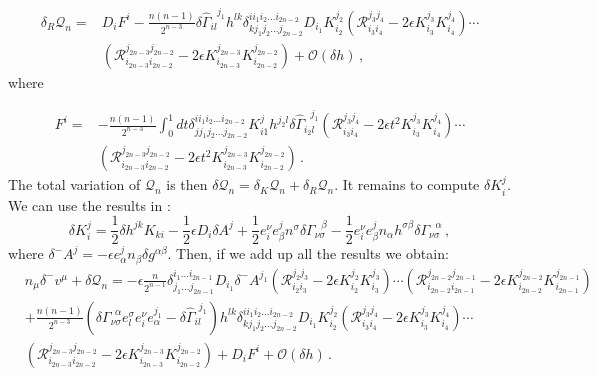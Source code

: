 \documentclass[11pt,letterpaper]{article}
\newcommand{\dslash}{\delta^{\!\!\!\!-}\!}
\begin{document}
\begin{equation}
\begin{aligned}
\delta_{R}\mathcal{Q}_n=&D_ i F^i-\frac{n(n-1)}{2^{n-3}}\delta \hat\Gamma_{i l}^{\ \ \ j_1}h^{l k} \delta^{i i_1 i_2\dots i_{2n-2}}_{k j_1 j_2\dots j_{2n-2}}D_{i_1}K_{i_2}^{j_2}\left(\mathcal{R}^{j_3 j_4}_{i_3i_4}-2\epsilon K^{j_3}_{i_3}K^{j_4}_{i_4}\right)\cdots \\
&\left(\mathcal{R}^{j_{2n-3}j_{2n-2}}_{i_{2n-3}i_{2n-2}}-2\epsilon K^{j_{2n-3}}_{i_{2n-3}}K^{j_{2n-2}}_{i_{2n-2}}\right)+\mathcal{O}(\delta h)\,,
\end{aligned}
\end{equation}
where

\begin{equation}
\begin{aligned}
F^i=&-\frac{n(n-1)}{2^{n-3}}\int_{0}^{1}dt \delta^{i i_1 i_2\dots i_{2n-2}}_{j j_1 j_2\dots j_{2n-2}} K^{j}_{i1} h^{j_2 l}\delta \hat\Gamma_{i_2 l}^{\ \ \ j_1}\left(\mathcal{R}^{j_3 j_4}_{i_3i_4}-2\epsilon t^2 K^{j_3}_{i_3}K^{j_4}_{i_4}\right)\cdots \\
&\left(\mathcal{R}^{j_{2n-3}j_{2n-2}}_{i_{2n-3}i_{2n-2}}-2\epsilon t^2 K^{j_{2n-3}}_{i_{2n-3}}K^{j_{2n-2}}_{i_{2n-2}}\right)\,.
\end{aligned}
\end{equation}
The total variation of $\mathcal{Q}_n$ is then $\delta \mathcal{Q}_n=\delta_{K} \mathcal{Q}_n+\delta_{R} \mathcal{Q}_n$. It remains to compute $\delta K^{j}_{i}$. We can use the results in \cite{Lehner:2016vdi}:
\begin{equation}
\delta K^{j}_{i}=\frac{1}{2}\delta h^{jk} K_{ki}-\frac{1}{2}\epsilon D_i \delta A^j+\frac{1}{2}e_{i}^{\nu}e^{j}_{\beta}n^{\sigma}\delta \Gamma_{\nu\sigma}^{\ \ \ \beta}-\frac{1}{2}e_{i}^{\nu}e^{j}_{\beta}n_{\alpha}h^{\sigma\beta}\delta \Gamma_{\nu\sigma}^{\ \ \ \alpha}\, ,
\end{equation}
where $\dslash  A^j=-\epsilon e^{j}_{\alpha}n_{\beta}\delta g^{\alpha\beta}$. Then, if we add up all the results we obtain:
\begin{equation}
\begin{aligned}
&n_{\mu}\dslash  v^{\mu}+\delta \mathcal{Q}_n=-\epsilon\frac{n}{2^{n-1}}\delta^{i_1\dots i_{2n-1}}_{j_1\dots j_{2n-1}}D_{i_1} \dslash  A^{j_1}\left(\mathcal{R}^{j_2 j_3}_{i_2i_3}-2\epsilon K^{j_2}_{i_2}K^{j_3}_{i_3}\right)\cdots \left(\mathcal{R}^{j_{2n-2}j_{2n-1}}_{i_{2n-2}i_{2n-1}}-2\epsilon K^{j_{2n-2}}_{i_{2n-2}}K^{j_{2n-1}}_{i_{2n-1}}\right)\\
&+\frac{n(n-1)}{2^{n-3}}\left(\delta \Gamma_{\nu\sigma}^{\ \ \alpha}e^{\sigma}_{l} e^{\nu}_{i}e_{\alpha}^{j_1}-\delta \hat\Gamma_{i l}^{\ \ j_1}\right)h^{lk}\delta^{i i_1 i_2\dots i_{2n-2}}_{k j_1 j_2\dots j_{2n-2}}D_{i_1}K_{i_2}^{j_2}\left(\mathcal{R}^{j_3 j_4}_{i_3i_4}-2\epsilon K^{j_3}_{i_3}K^{j_4}_{i_4}\right)\cdots \\
&\left(\mathcal{R}^{j_{2n-3}j_{2n-2}}_{i_{2n-3}i_{2n-2}}-2\epsilon K^{j_{2n-3}}_{i_{2n-3}}K^{j_{2n-2}}_{i_{2n-2}}\right)+D_i F^i+\mathcal{O}(\delta h)\, .
\end{aligned}
\end{equation}
\end{document}
